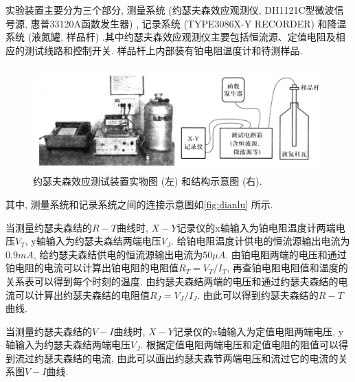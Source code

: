 \documentclass[font=default]{mpltx}
\newcommand{\note}[1]{{\color{gray}#1}}
\newcommand*\cs[1]{\texttt{\textbackslash #1}}
\begin{document}
  实验装置主要分为三个部分, 测量系统 (约瑟夫森效应观测仪, DH1121C型微波信号源, 惠普33120A函数发生器) , 记录系统 (TYPE3086X-Y RECORDER) 和降温系统 (液氮罐, 样品杆) .其中约瑟夫森效应观测仪主要包括恒流源、定值电阻及相应的测试线路和控制开关. 样品杆上内部装有铂电阻温度计和待测样品. 



\begin{figure}[htbp]
  \centering
  \includegraphics[width=0.85\linewidth]{fig/1.png}
  \caption{约瑟夫森效应测试装置实物图 (左) 和结构示意图 (右).
    }
  \label{fig:dianlu}
\end{figure}

  其中, 测量系统和记录系统之间的连接示意图如\autoref{fig:dianlu} 所示.
  \par
  当测量约瑟夫森结的$R-T$曲线时, $X-Y$记录仪的x轴输入为铂电阻温度计两端电压$V_T$, y轴输入为约瑟夫森结两端电压$V_J$. 给铂电阻温度计供电的恒流源输出电流为$0.9mA$, 
  给约瑟夫森结供电的恒流源输出电流为$50\mu A$. 由铂电阻两端的电压和通过铂电阻的电流可以计算出铂电阻的电阻值$R_T=V_T/I_T$, 再查铂电阻电阻值和温度的关系表可以得到每个时刻的温度.
  由约瑟夫森结两端的电压和通过约瑟夫森结的电流可以计算出约瑟夫森结的电阻值$R_J=V_J/I_J$. 由此可以得到约瑟夫森结的$R-T$曲线.
  \par
  当测量约瑟夫森结的$V-I$曲线时, $X-Y$记录仪的x轴输入为定值电阻两端电压, y轴输入为约瑟夫森结两端电压$V_J$. 
  根据定值电阻两端电压和定值电阻的阻值可以得到流过约瑟夫森结的电流, 由此可以画出约瑟夫森节两端电压和流过它的电流的关系图$V-I$曲线.
  
\end{document}

